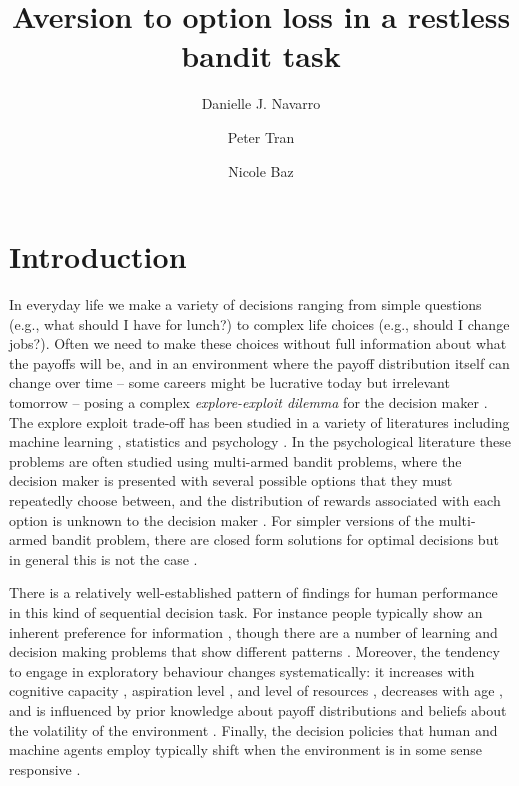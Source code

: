\documentclass[a4paper,doc,natbib]{apa6}
\affiliation{\hspace*{2pt}} %
\title{Aversion to option loss in a restless bandit task}
\author[1]{\normalsize Danielle J. Navarro}
\author[1]{\normalsize Peter Tran}
\author[1]{\normalsize Nicole Baz}
\affil[1]{\small School of Psychology, University of New South Wales, NSW 2052, Australia}
\begin{document}
\maketitle

\section{Introduction}

In everyday life we make a variety of decisions ranging from simple questions (e.g., what should I have for lunch?) to complex life choices (e.g., should I change jobs?). Often we need to make these choices without full information about what the payoffs will be, and in an environment where the payoff distribution itself can change over time -- some careers might be lucrative today but irrelevant tomorrow -- posing a complex {\it explore-exploit dilemma} for the decision maker \citep{mehlhorn2015unpacking}. The explore exploit trade-off has been studied in a variety of literatures including machine learning \citep{kaelbling1998planning}, statistics \citep{wald1947sequential} and psychology \citep{wilson2014humans}. In the psychological literature these problems are often studied using multi-armed bandit problems, where the decision maker is presented with several possible options that they must repeatedly choose between, and the distribution of rewards associated with each option is unknown to the decision maker \citep[e.g.,][]{banks1997experimental,speekenbrink2015uncertainty, daw2006cortical, steyvers2009bayesian,cohen2007should,zhang2013forgetful,biele2009learning,acuna2010structure,yi2009modeling,anderson2012ambiguity,reverdy2014modeling}. For simpler versions of the multi-armed bandit problem, there are closed form solutions for optimal decisions \citep{whittle1980multi} but in general this is not the case \citep[see][]{burtini2015survey}.

There is a relatively well-established pattern of findings for human performance in this kind of sequential decision task. For instance  people typically show an inherent preference for information \citep{bennett2016intrinsic,navarro2016learning}, though there are a number of learning and decision making problems that show different patterns \citep{iigaya2016modulation,zhu2017information,gigerenzer2017cassandra}. Moreover, the tendency to engage in exploratory behaviour changes systematically: it increases with cognitive capacity \citep{hills2012dynamic}, aspiration level \citep{hausmann2008sequential}, and level of resources \citep{perry2013neural}, decreases with age \citep{mata2013foraging}, and is influenced by prior knowledge about payoff distributions \citep{mulder2012bias} and beliefs about the volatility of the environment \citep{yi2009modeling,navarro2016learning}. Finally, the decision policies that human and machine agents employ typically shift when the environment is in some sense responsive \citep[e.g.][]{gureckis2009short,bogacz2007short,neth2014foraging,HotalingNN_skilledcogsci}.
\end{document}
